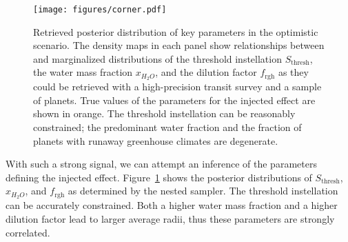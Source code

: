 \documentclass[twocolumn,twocolappendix,linenumbers]{aastex631}
\begin{document}
\begin{figure}[ht!]
    \begin{centering}
        \texttt{[image: figures/corner.pdf]}
        \caption{
            Retrieved posterior distribution of key parameters in the optimistic scenario. The density maps in each panel show relationships between and marginalized distributions of the threshold instellation $S_\mathrm{thresh}$, the  water mass fraction $x_{H_2O}$, and the dilution factor $f_\mathrm{rgh}$ as they could be retrieved with a high-precision transit survey and a sample of  planets. True values of the parameters for the injected effect are shown in orange. The threshold instellation can be reasonably constrained; the predominant water fraction and the fraction of planets with runaway greenhouse climates are degenerate.
        }
        \label{fig:cornerplot}
    \end{centering}
\end{figure}
With such a strong signal, we can attempt an inference of the parameters defining the injected effect.
Figure~\ref{fig:cornerplot} shows the posterior distributions of $S_\mathrm{thresh}$, $x_{H_2O}$, and $f_\mathrm{rgh}$ as determined by the nested sampler.
The threshold instellation can be accurately constrained. %
Both a higher water mass fraction and a higher dilution factor lead to larger average radii, thus these parameters are strongly correlated.
\end{document}

